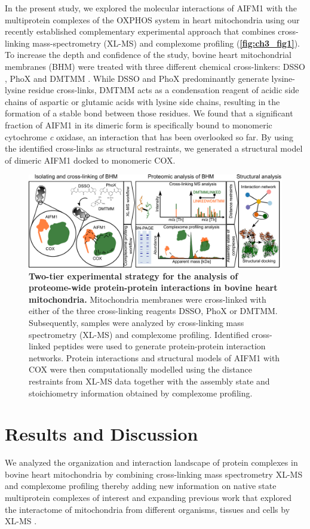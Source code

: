 In the present study, we explored the molecular interactions of AIFM1 with the multiprotein complexes of the OXPHOS system in heart mitochondria using our recently established complementary experimental approach \cite{RN11} that combines cross-linking mass-spectrometry (XL-MS) and complexome profiling (\textbf{\autoref{fig:ch3_fig1}}). To increase the depth and confidence of the study, bovine heart mitochondrial membranes (BHM) were treated with three different chemical cross-linkers: DSSO \cite{RN12}, PhoX \cite{RN13} and DMTMM \cite{RN14}. While DSSO and PhoX predominantly generate lysine-lysine residue cross-links, DMTMM acts as a condensation reagent of acidic side chains of aspartic or glutamic acids with lysine side chains, resulting in the formation of a stable bond between those residues. We found that a significant fraction of AIFM1 in its dimeric form is specifically bound to monomeric cytochrome \emph{c} oxidase, an interaction that has been overlooked so far. By using the identified cross-links as structural restraints, we generated a structural model of dimeric AIFM1 docked to monomeric COX.
\begin{figure}[htb]
    \center
    \includegraphics[]{Chapter.3/Figures/Figure1.png}
    \caption{\textbf{Two-tier experimental strategy for the analysis of proteome-wide protein-protein interactions in bovine heart mitochondria.} Mitochondria membranes were cross-linked with either of the three cross-linking reagents DSSO, PhoX or DMTMM. Subsequently, samples were analyzed by cross-linking mass spectrometry (XL-MS) and complexome profiling. Identified cross-linked peptides were used to generate protein-protein interaction networks. Protein interactions and structural models of AIFM1 with COX were then computationally modelled using the distance restraints from XL-MS data together with the assembly state and stoichiometry information obtained by complexome profiling.}
    \label{fig:ch3_fig1}
\end{figure}
%
\section{Results and Discussion}
We analyzed the organization and interaction landscape of protein complexes in bovine heart mitochondria by combining cross-linking mass spectrometry XL-MS and complexome profiling \cite{RN15, RN11} thereby adding new information on native state multiprotein complexes of interest and expanding previous work that explored the interactome of mitochondria from different organisms, tissues and cells by XL-MS \cite{RN20, RN18, RN16, RN19, RN17}.
%
